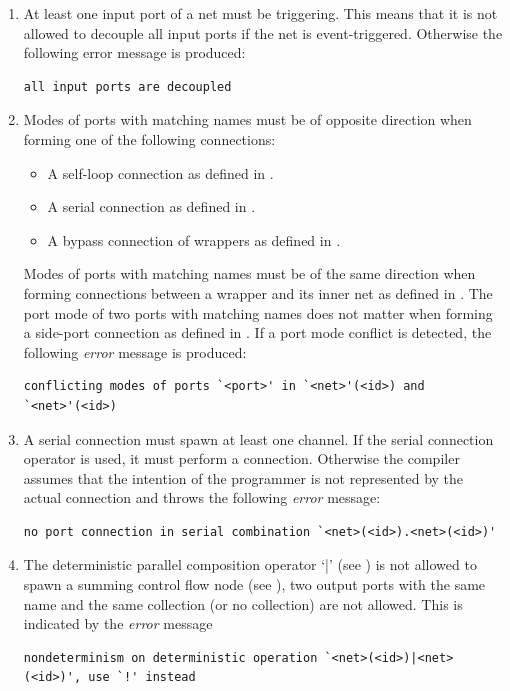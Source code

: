 \begin{enumerate}
    \item At least one input port of a net must be triggering.
        This means that it is not allowed to decouple all input ports if the net is event-triggered.
        Otherwise the following error message is produced:
\begin{lstlisting}[style=msg]
all input ports are decoupled
\end{lstlisting}

    \item Modes of ports with matching names must be of opposite direction when forming one of the following connections:
        \begin{itemize}
            \item A self-loop connection as defined in \Def{\ref{def_smx_self}}.
            \item A serial connection as defined in \Def{\ref{def_smx_sc}}.
            \item A bypass connection of wrappers as defined in \Equ{\ref{eq_smx_wrap_con_by}}.
        \end{itemize}
        Modes of ports with matching names must be of the same direction when forming connections between a wrapper and its inner net as defined in \Equ{\ref{eq_smx_wrap_con_net}}.
        The port mode of two ports with matching names does not matter when forming a side-port connection as defined in \Def{\ref{def_smx_side}}.
        If a port mode conflict is detected, the following \emph{error} message is produced:
\begin{lstlisting}[style=msg]
conflicting modes of ports `<port>' in `<net>'(<id>) and `<net>'(<id>)
\end{lstlisting}

    \item A serial connection must spawn at least one channel.
        If the serial connection operator is used, it must perform a connection.
        Otherwise the compiler assumes that the intention of the programmer is not represented by the actual connection and throws the following \emph{error} message:
\begin{lstlisting}[style=msg]
no port connection in serial combination `<net>(<id>).<net>(<id>)'
\end{lstlisting}

    \item The deterministic parallel composition operator `|' (see \Def{\ref{def_smx_pd}}) is not allowed to spawn a summing control flow node (see \Sect{\ref{sect_smx_box_implicit_flow}}), \ie two output ports with the same name and the same collection (or no collection) are not allowed.
        This is indicated by the \emph{error} message
\begin{lstlisting}[style=msg]
nondeterminism on deterministic operation `<net>(<id>)|<net>(<id>)', use `!' instead
\end{lstlisting}


\end{enumerate}

